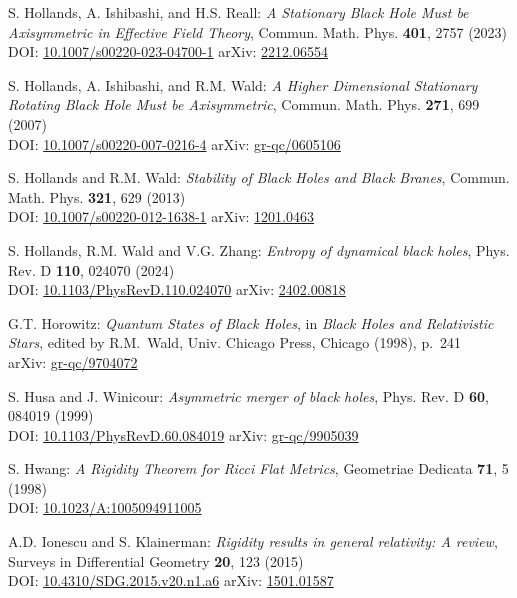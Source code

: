 \begin{thebibliography}{123}
S. Hollands, A. Ishibashi, and H.S. Reall:
{\em A Stationary Black Hole Must be Axisymmetric in Effective Field Theory},
Commun. Math. Phys. {\bf 401}, 2757 (2023)\\
DOI: \href{https://doi.org/10.1007/s00220-023-04700-1}{10.1007/s00220-023-04700-1}\hfill
arXiv: \href{https://arxiv.org/abs/2212.06554}{2212.06554}

S. Hollands, A. Ishibashi, and R.M. Wald:
{\em A Higher Dimensional Stationary Rotating Black Hole Must be Axisymmetric},
Commun. Math. Phys. {\bf 271}, 699 (2007)\\
DOI: \href{https://doi.org/10.1007/s00220-007-0216-4}{10.1007/s00220-007-0216-4}\hfill
arXiv: \href{https://arxiv.org/abs/gr-qc/0605106}{gr-qc/0605106}

S. Hollands and R.M. Wald:
{\em Stability of Black Holes and Black Branes},
Commun. Math. Phys. {\bf 321}, 629 (2013)\\
DOI: \href{https://doi.org/10.1007/s00220-012-1638-1}{10.1007/s00220-012-1638-1}\hfill
arXiv: \href{https://arxiv.org/abs/1201.0463}{1201.0463}

S. Hollands, R.M. Wald and V.G. Zhang:
{\em Entropy of dynamical black holes},
Phys. Rev. D {\bf 110}, 024070 (2024)\\
DOI: \href{https://doi.org/10.1103/PhysRevD.110.024070}{10.1103/PhysRevD.110.024070}\hfill
arXiv: \href{https://arxiv.org/abs/2402.00818}{2402.00818}

G.T. Horowitz:
{\em Quantum States of Black Holes},
in {\em Black Holes and Relativistic Stars}, edited by R.M.~Wald,
Univ. Chicago Press, Chicago (1998), p.~241\\
arXiv: \href{https://arxiv.org/abs/gr-qc/9704072}{gr-qc/9704072}

S. Husa and J. Winicour:
{\em Asymmetric merger of black holes},
Phys. Rev. D {\bf 60}, 084019 (1999)\\
DOI: \href{https://doi.org/10.1103/PhysRevD.60.084019}{10.1103/PhysRevD.60.084019}\hfill
arXiv: \href{https://arxiv.org/abs/gr-qc/9905039}{gr-qc/9905039}

S. Hwang:
{\em A Rigidity Theorem for Ricci Flat Metrics},
Geometriae Dedicata {\bf 71}, 5 (1998)\\
DOI: \href{https://doi.org/10.1023/A:1005094911005}{10.1023/A:1005094911005}

A.D. Ionescu and S. Klainerman:
{\em Rigidity results in general relativity: A review},
Surveys in Differential Geometry {\bf 20}, 123 (2015)\\
DOI: \href{https://dx.doi.org/10.4310/SDG.2015.v20.n1.a6}{10.4310/SDG.2015.v20.n1.a6}\hfill
arXiv: \href{https://arxiv.org/abs/1501.01587}{1501.01587}


\end{thebibliography}
